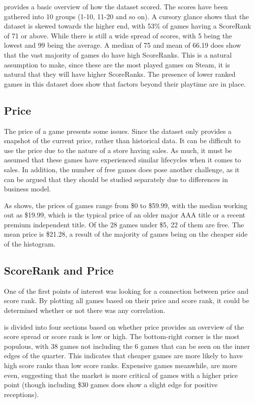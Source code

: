 \documentclass[dataset.tex]{subfiles}
\begin{document}
 provides a basic overview of how the dataset scored.
The scores have been gathered into 10 groups (1-10, 11-20 and so on). A cursory
glance shows that the dataset is skewed towards the higher end, with 53\% of
games having a ScoreRank of 71 or above. While there is still a wide spread of
scores, with 5 being the lowest and 99 being the average. A median of 75 and
mean of 66.19 does show that the vast majority of games do have high ScoreRanks.
This is a natural assumption to make, since these are the most played games on
Steam, it is natural that they will have higher ScoreRanks. The presence of
lower ranked games in this dataset does show that factors beyond their playtime
are in place.

\subsection{Price} %
\label{sub:price}
The price of a game presents some issues. Since the dataset only provides a
snapshot of the current price, rather than historical data. It can be difficult
to use the price due to the nature of a store having sales. As much, it must be
assumed that these games have experienced similar lifecycles when it comes to
sales. In addition, the number of free games does pose another challenge, as it
can be argued that they should be studied separately due to differences in
business model.

As  shows, the prices of games range from \$0 to \$59.99,
with the median working out as \$19.99, which is the typical price of an older
major AAA title or a recent premium independent title. Of the 28 games under
\$5, 22 of them are free. The mean price is \$21.28, a result of the majority of
games being on the cheaper side of the histogram.

\subsection{ScoreRank and Price} %
\label{sub:scorerank_and_price}
One of the first points of interest was looking for a connection between price
and score rank. By plotting all games based on their price and score rank, it
could be determined whether or not there was any correlation.

 is divided into four sections based on whether price
provides an overview of the score spread or score rank is low or high. The
bottom-right corner is the most populous, with 38 games not including the 6
games that can be seen on the inner edges of the quarter. This indicates that
cheaper games are more likely to have high score ranks than low score ranks.
Expensive games meanwhile, are more even, suggesting that the market is more
critical of games with a higher price point (though including \$30 games does
show a slight edge for positive receptions).
\end{document}
